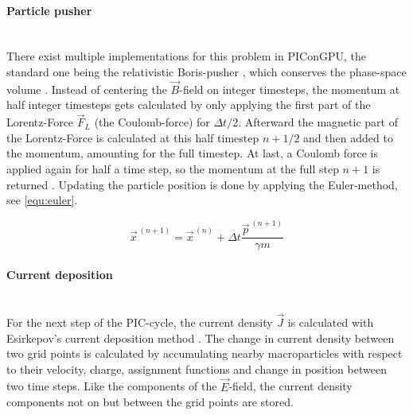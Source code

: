 \documentclass[bachelor_thesis]{subfiles}
\begin{document}
\paragraph*{Particle pusher}\hspace{0pt} \\
There exist multiple implementations for this problem in PIConGPU, the standard one being the relativistic Boris-pusher \cite{Boris1970}, which conserves the phase-space volume \cite{PICRepo}. Instead of centering the $\vec{B}$-field on integer timesteps, the momentum at half integer timesteps gets
calculated by only applying the first part of the Lorentz-Force $\vec{F}_L$ (the Coulomb-force) for $\Delta t/2$. Afterward the magnetic part of the Lorentz-Force is calculated at this half timestep $n+1/2$ and then added to the momentum, amounting for the full timestep.
At last, a Coulomb force is applied again for half a time step, so the momentum at the full step $n+1$ is returned \cite{Zenitani2018, Pausch2019}. Updating the particle position is done by applying the Euler-method, see \autoref{equ:euler}.

\begin{equation}
	\vec{x}^{\,(n+1)} = \vec{x}^{\,(n)} + \Delta t \frac{\vec{p}^{\,(n+1)}}{\gamma m}
	\label{equ:euler}
\end{equation}

\paragraph*{Current deposition}\hspace{0pt} \\
For the next step of the PIC-cycle, the current density $\vec{J}$ is calculated with Esirkepov’s current deposition method \cite{Esirkepov2001}.
The change in current density between two grid points is calculated by accumulating nearby macroparticles with respect to their velocity, charge, assignment functions and change in position between two time steps. 
Like the components of the $\vec{E}$-field, the current density components not on but between the grid points are stored.
\end{document}
